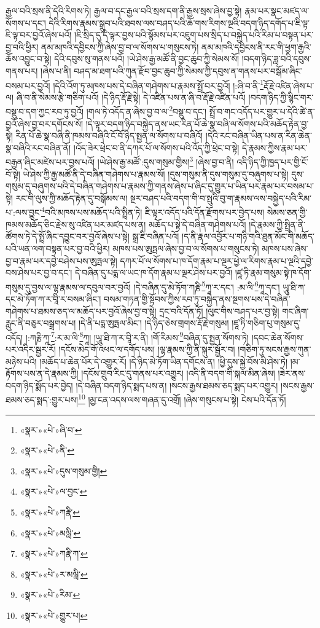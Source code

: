 རྒྱལ་བའི་སྲས་ནི་དེའི་རིགས་ཏེ། རྒྱལ་བ་དང་རྒྱལ་བའི་སྲས་དག་ནི་རྒྱས་སྲས་ཞེས་བྱ་སྟེ། རྣམ་པར་སྣང་མཛད་ལ་སོགས་པ་དང་། དེའི་རིགས་རྣམས་སྒྲུབ་པའི་ཐབས་ལས་བཤད་པའི་ཆོ་གས་རིགས་ལྔའི་བདག་ཉིད་དགོད་པ་ཇི་ལྟ་ཇི་ལྟ་བར་བྱའོ་ཞེས་པའོ། །ཇི་སྲིད་དུ་དེ་ལྟར་བྱས་པའི་སྙོམས་པར་འཇུག་པས་སྲིད་པ་བསྐྱེད་པའི་རིམ་པ་བསྟན་པར་བྱ་བའི་ཕྱིར། ནམ་མཁའི་དབྱིངས་ཀྱི་ཞེས་བྱ་བ་ལ་སོགས་པ་གསུངས་ཏེ། ནམ་མཁའི་དབྱིངས་ནི་རང་གི་ཕྱག་རྒྱའི་ཆོས་འབྱུང་བ་སྟེ། དེའི་དབུས་སུ་གནས་པའོ། །ཡེ་ཤེས་རྒྱ་མཚོ་ནི་བྱང་ཆུབ་ཀྱི་སེམས་སོ། །བདག་ཉིད་ཟླ་བའི་དབུས་གནས་པར། །ཞེས་པ་ནི། བཤད་མ་ཐག་པའི་ཀུན་རྫོབ་བྱང་ཆུབ་ཀྱི་སེམས་ཀྱི་དབུས་ན་གནས་པར་བསྒོམ་ཞིང་བསམ་པར་བྱའོ། །དེའི་འོག་ཏུ་མཁས་པས་དེ་བཞིན་གཤེགས་པ་རྣམས་སྤྲོ་བར་བྱའོ། །:ཞི་བ་ནི་\footnote{«སྣར་»«པེ་»ཞི་བ་}རྡོ་རྗེ་འཛིན་ཞེས་པ་ལ། ཞི་བ་ནི་སེམས་རྩེ་གཅིག་པའོ། །དེ་ཉིད་རྡོ་རྗེ་སྟེ། དེ་འཛིན་པས་ན་ཞི་བ་རྡོ་རྗེ་འཛིན་པའོ། །བདག་ཉིད་ཀྱི་སྙིང་གར་བསྡུ་བ་དག་ཀྱང་རབ་ཏུ་བྱའོ། །གལ་ཏེ་འདོད་ན་ཞེས་བྱ་བ་ལ་\footnote{«སྣར་»«པེ་»ནི་}བསྡུ་བ་དང་། སྤྲོ་བ་གང་འདོད་པར་གྱུར་པ་དེའི་ཚེ་ན་བྱའོ་ཞེས་བྱ་བར་དགོངས་སོ། །དེ་ལྟར་བདག་ཉིད་བསྐྱེད་ནས་ཡང་རིན་པོ་ཆེ་སྣ་བཞི་ལ་སོགས་པའི་མཆོད་རྟེན་བྱ་སྟེ། རིན་པོ་ཆེ་སྣ་བཞི་ནི་ཁམས་བཞིའི་ངོ་བོ་ཉིད་སྤྱན་ལ་སོགས་པ་བཞིའོ། །དེའི་རང་བཞིན་ཡིན་པས་ན་རིན་ཆེན་སྣ་བཞིའི་རང་བཞིན་ནོ། །འོད་ཟེར་ཕྲེང་བ་ནི་དཀར་པོ་ལ་སོགས་པའི་འོད་ཀྱི་ཕྲེང་བ་སྟེ། དེ་རྣམས་ཀྱིས་རྣམ་པར་བརྒྱན་ཞིང་མཛེས་པར་བྱས་པའོ། །ཡེ་ཤེས་རྒྱ་མཚོ་:དུས་གསུམ་གྱིས།\footnote{«སྣར་»«པེ་»དུས་གསུམ་གྱི།} །ཞེས་བྱ་བ་ནི། འདི་ཉིད་ཀྱི་ཁྱད་པར་གྱི་ངོ་བོ་སྟེ། ཡེ་ཤེས་ཀྱི་རྒྱ་མཚོ་ནི་དེ་བཞིན་གཤེགས་པ་རྣམས་སོ། །དུས་གསུམ་ནི་དུས་གསུམ་དུ་བཞུགས་པ་སྟེ། དུས་གསུམ་དུ་བཞུགས་པའི་དེ་བཞིན་གཤེགས་པ་རྣམས་ཀྱི་གནས་ཞེས་པ་ཞིང་དུ་གྱུར་པ་ཡིན་པར་རྣམ་པར་བསམ་པ་སྟེ། རང་གི་ལུས་ཀྱི་མཆོད་རྟེན་དུ་བསྒོམས་ལ། སྔར་བཤད་པའི་བདག་གི་བ་སྤུའི་བུ་ག་རྣམས་ལས་བསྐྱེད་པའི་རིམ་པ་:ལས་བྱུང་\footnote{«སྣར་»«པེ་»ལ་བྱང་}བའི་མཁས་པས་མཆོད་པའི་སྤྲིན་ཏེ། ཇི་ལྟར་འདོད་པའི་དོན་རྫོགས་པར་བྱེད་པས། སེམས་ཅན་གྱི་ཁམས་མཆོད་ཅིང་རྗེས་སུ་འཛིན་པར་མཛད་པས་ན། མཆོད་པ་སྟེ་དེ་བཞིན་གཤེགས་པའོ། །དེ་རྣམས་ཀྱི་སྤྲིན་ནི་ཚོགས་ཏེ་དེ་སྤྲོ་ཞིང་དབྱུང་བར་བྱའོ་ཞེས་པ་སྟེ། སྒྲ་ཇི་བཞིན་པའོ། །ད་ནི་རྣལ་འབྱོར་པ་གཉི་གའི་ཐུན་མོང་གི་མཆོད་པའི་ཡན་ལག་བསྟན་པར་བྱ་བའི་ཕྱིར། མཁས་པས་ཨུཏྤལ་ཞེས་བྱ་བ་ལ་སོགས་པ་གསུངས་ཏེ། མཁས་པས་ཞེས་བྱ་བ་རྣམ་པར་དབྱེ་བཤེས་པས་ཨུཏྤལ་སྟེ། དཀར་པོ་ལ་སོགས་པ་ཁ་དོག་རྣམ་པ་ལྔར་ཕྱེ་ལ་རིགས་རྣམ་པ་ལྔའི་དབྱེ་བས་ཤེས་པར་བྱ་བ་དང་། དེ་བཞིན་དུ་པདྨ་ལ་ཡང་ཁ་དོག་རྣམ་པ་ལྔར་ཤེས་པར་བྱའོ། །ཛཱ་ཏི་རྣམ་གསུམ་སྟེ་ཁ་དོག་གསུམ་དུ་བྱས་ལ་ལྷ་རྣམས་ལ་དབུལ་བར་བྱའོ། །དེ་བཞིན་དུ་མེ་ཏོག་ཀརྞི་\footnote{«སྣར་»«པེ་»ཀརྣི་}ཀཱ་ར་དང་། :མ་ལི་\footnote{«སྣར་»«པེ་»མལླི་}ཀཱ་དང་། ཡཱུ་ཐི་ཀ་དང་མེ་ཏོག་ཀ་ར་བཱི་ར་བསམ་ཞིང་། བསམ་གཏན་གྱི་སྟོབས་ཀྱིས་རབ་ཏུ་བསྐྱེད་ནས་སྔགས་པས་དེ་བཞིན་གཤེགས་པ་ཐམས་ཅད་ལ་མཆོད་པར་བྱའོ་ཞེས་བྱ་བ་སྟེ། དྲང་བའི་དོན་ཏོ། །ལུང་གིས་བཤད་པར་བྱ་སྟེ། གང་ཞིག་རླུང་ནི་བཅུར་བསྒྲགས་པ། །དེ་ནི་པདྨ་ཨུཏྤལ་མིང་། །དེ་ཉིད་ཅེས་གྲགས་རྡོ་རྗེ་གསུམ། །ཛཱ་ཏི་གཅིག་པུ་གསུམ་དུ་འདོད། །:ཀརྞི་ཀཱ་\footnote{«སྣར་»«པེ་»ཀརྣི་ཀ་}:ར་མ་ལི་\footnote{«སྣར་»«པེ་»ར་མལླི་}ཀཱ། །ཡཱུ་ཐི་ཀ་ར་བཱི་ར་ནི། །གོ་རིམས་\footnote{«སྣར་»«པེ་»རིམ་}བཞིན་དུ་སྤྱན་སོགས་ཏེ། །དབང་ཆེན་སོགས་པར་འདིར་སྦྱར་རོ། །དངོས་མེད་གོ་འཕང་ལ་དགོད་པས། །ལྷ་རྣམས་ཀྱི་ནི་སྐུར་སྦྱོར་བ། །གཅིག་ཏུ་སངས་རྒྱས་ཀུན་མཉེས་པའི། །མཆོད་པ་ཆེན་པོར་དེ་འགྱུར་རོ། །དེ་ཉིད་མེ་ཏོག་ཡིན་དགོངས་ན། །ཕྱི་དུས་སྐྱེ་བོས་མི་ཤེས་ཏེ། །མ་རྟོགས་པས་ན་དེ་རྣམས་ཀྱི། །དངོས་གྲུབ་རིང་དུ་གནས་པར་འགྱུར། །འདི་ནི་བདག་གི་སྐལ་མིན་ཞེས། །ཟེར་ནས་བདག་ཉིད་སྨོད་པར་བྱེད། །དེ་བཞིན་བདག་ཉིད་སྨད་པས་ན། །སངས་རྒྱས་ཐམས་ཅད་སྨད་པར་འགྱུར། །སངས་རྒྱས་ཐམས་ཅད་སྨད་:གྱུར་པས།\footnote{«སྣར་»«པེ་»གྱུར་པ།} །མྱ་ངན་འདས་ལས་གཞན་དུ་འགྲོ། །ཞེས་གསུངས་པ་སྟེ། ངེས་པའི་དོན་ཏོ། 